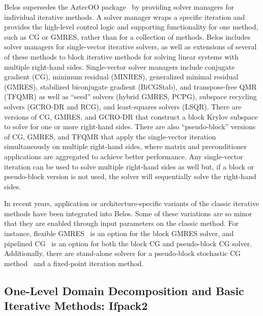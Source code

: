 Belos supersedes the AztecOO package~\cite{Heroux2004a} by providing solver managers for individual iterative methods. A solver manager wraps a specific iteration and provides the high-level control logic and supporting functionality for one method, such as CG or GMRES, rather than for a collection of methods. Belos includes solver managers for single-vector iterative solvers, as well as extensions of several of these methods to block iterative methods for solving linear systems with multiple right-hand sides.  Single-vector solver managers include conjugate gradient (CG), minimum residual (MINRES), generalized minimal residual (GMRES), stabilized biconjugate gradient (BiCGStab), and transpose-free QMR (TFQMR) as well as ``seed'' solvers (hybrid GMRES, PCPG), subspace recycling solvers (GCRO-DR and RCG), and least-squares solvers (LSQR).  There are versions of CG, GMRES, and GCRO-DR that construct a block Krylov subspace to solve for one or more right-hand sides.  There are also ``pseudo-block'' versions of CG, GMRES, and TFQMR that apply the single-vector iteration simultaneously on multiple right-hand sides, where matrix and preconditioner applications are aggregated to achieve better performance. Any single-vector iteration can be used to solve multiple right-hand sides as well but, if a block or pseudo-block version is not used, the solver will sequentially solve the right-hand sides.

In recent years, application or architecture-specific variants of the classic iterative methods have been integrated into Belos. Some of these variations are so minor that they are enabled through input parameters on the classic method. For instance, flexible GMRES~\cite{Saad1993a} is an option for the block GMRES solver, and pipelined CG~\cite{GHYSELS2014224} is an option for both the block CG and pseudo-block CG solver.  Additionally, there are stand-alone solvers for a pseudo-block stochastic CG method~\cite{Parker2012SamplingGD} and a fixed-point iteration method.


\subsection{One-Level Domain Decomposition and Basic Iterative Methods: Ifpack2}

